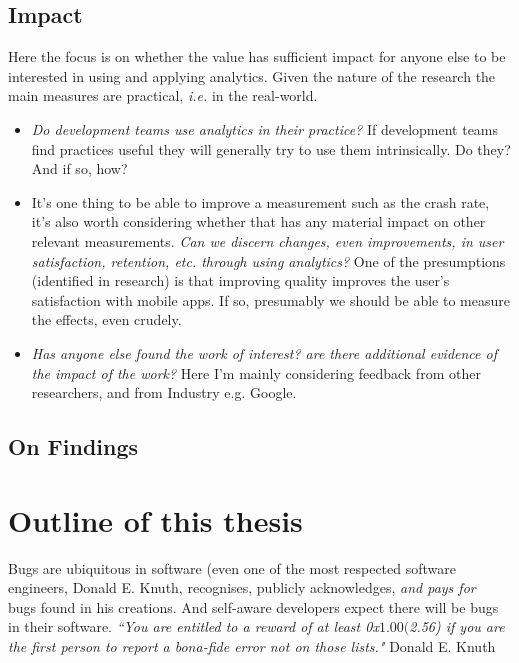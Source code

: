 \subsection{Impact}
Here the focus is on whether the value has sufficient impact for anyone else to be interested in using and applying analytics. Given the nature of the research the main measures are practical, \emph{i.e.} in the real-world.
\begin{itemize}
    \item \emph{Do development teams use analytics in their practice?} If development teams find practices useful they will generally try to use them intrinsically. Do they? And if so, how?
    \item It's one thing to be able to improve a measurement such as the crash rate, it's also worth considering whether that has any material impact on other relevant measurements. \emph{Can we discern changes, even improvements, in user satisfaction, retention, etc. through using analytics?} One of the presumptions (identified in research) is that improving quality improves the user's satisfaction with mobile apps. If so, presumably we should be able to measure the effects, even crudely.
    \item \emph{Has anyone else found the work of interest? are there additional evidence of the impact of the work?} Here I'm mainly considering feedback from other researchers, and from Industry e.g. Google.
\end{itemize}




\subsection{On Findings}



\section{Outline of this thesis}
Bugs are ubiquitous in software (even one of the most respected software engineers, Donald E. Knuth, recognises, publicly acknowledges, \emph{and pays for}~\cite{knuth_trutex, wikipedia__knuth_reward_checks_2020} bugs found in his creations. And self-aware developers expect there will be bugs in their software. \emph{``You are entitled to a reward of at least 0x$1.00 ($2.56) if you are the first person to report a bona-fide error not on those lists."} Donald E. Knuth~\cite{knuth_the_bank_of_san_serriffe}


